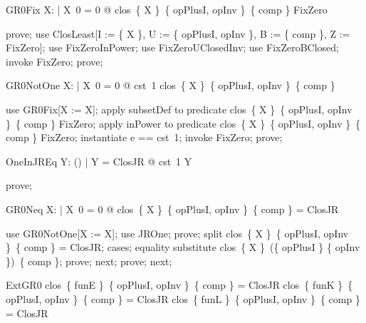 \documentclass{article}
\begin{document}
\begin{theorem}{GR0Fix}
  \forall X: \nat \fun \nat | X~0 = 0 @ clos~\{ X \}~\{ opPlusI, opInv \}~\{ comp \} \subseteq FixZero
\end{theorem}

\begin{zproof}
prove;
use ClosLeast[I := \{ X \}, U := \{ opPlusI, opInv \}, B := \{ comp \}, Z := FixZero];
use FixZeroInPower;
use FixZeroUClosedInv;
use FixZeroBClosed;
invoke FixZero;
prove;
\end{zproof}

\begin{theorem}{GR0NotOne}
  \forall X: \nat \fun \nat | X~0 = 0 @ \lnot cst~1 \in clos~\{ X \}~\{ opPlusI, opInv \}~\{ comp \}
\end{theorem}

\begin{zproof}
use GR0Fix[X := X];
apply subsetDef to predicate clos~\{ X \}~\{ opPlusI, opInv \}~\{ comp \} \subseteq FixZero;
apply inPower to predicate clos~\{ X \}~\{ opPlusI, opInv \}~\{ comp \} \in \power FixZero;
instantiate e == cst~1;
invoke FixZero;
prove;
\end{zproof}

\begin{theorem}{OneInJREq}
  \forall Y: \power (\nat \fun \nat) | Y = ClosJR @ cst~1 \in Y
\end{theorem}

\begin{zproof}
prove;
\end{zproof}

\begin{theorem}{GR0Neq}
  \forall X: \nat \fun \nat | X~0 = 0 @ \lnot clos~\{ X \}~\{ opPlusI, opInv \}~\{ comp \} = ClosJR
\end{theorem}

\begin{zproof}
use GR0NotOne[X := X];
use JROne;
prove;
split clos~\{ X \}~\{ opPlusI, opInv \}~\{ comp \} = ClosJR;
cases;
equality substitute clos~\{ X \}~(\{ opPlusI \} \cup \{ opInv \})~\{ comp \};
prove;
next;
prove;
next;
\end{zproof}

\begin{theorem}{ExtGR0}
  \lnot clos~\{ funE \}~\{ opPlusI, opInv \}~\{ comp \} = ClosJR \land \lnot clos~\{ funK \}~\{ opPlusI, opInv \}~\{ comp \} = ClosJR \land \lnot clos~\{ funL \}~\{ opPlusI, opInv \}~\{ comp \} = ClosJR
\end{theorem}
\end{document}
